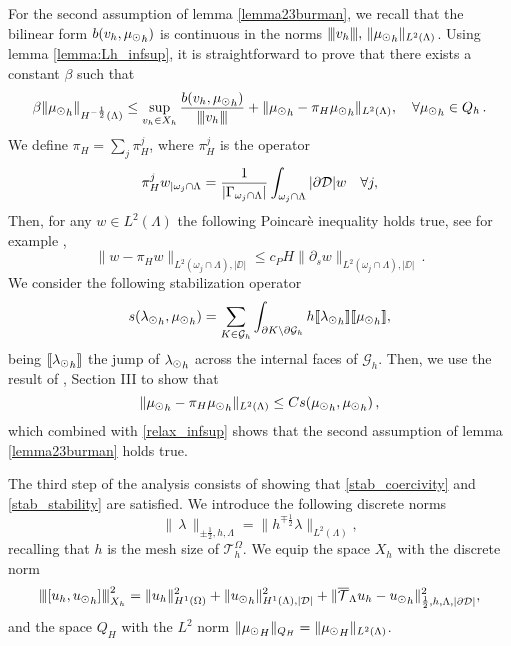 For the second assumption of lemma \ref{lemma23burman}, we recall that the bilinear form $b(v_h,{\mu_{\odot}}_h)$ is continuous in the norms ${\left\vert\kern-0.25ex\left\vert\kern-0.25ex\left\vert v_h \right\vert\kern-0.25ex\right\vert\kern-0.25ex\right\vert},\,\|{\mu_{\odot}}_h\|_{L^2(\Lambda)}$. 
Using lemma \ref{lemma:Lh_infsup}, it is straightforward to prove that there exists a constant $\beta$ such that
\begin{equation}\label{relax_infsup}
\beta \|{\md}_h\|_{H^{-\frac12}(\Lambda)} \leq \sup\limits_{v_h \in X_h} \frac{b(v_h,{\md}_h)}{\vertiii{v_h}} + \|{\md}_h-\pi_H {\md}_h\|_{L^2(\Lambda)}, \quad \forall {\md}_h \in Q_h\,.
\end{equation}
We define $\pi_H = \sum_j \pi_H^j$, where $\pi_H^j$ is the operator
\begin{equation}\label{eq:projector}
\pi_H^j w_{|\patch \cap \Lambda} =\frac{1}{|\Gamma_{\patch\cap \Lambda}|}\int_{\patch\cap \Lambda}|\DD| w\quad \forall j,
\end{equation}   
 Then, for any $w \in L^2(\Lambda)$ the following Poincarè inequality holds true, see for example \cite[Corollary B.65]{MR2050138},
\begin{equation}\label{disc_poincare_ineq}
\|w - \pi_H w\|_{L^2(\omega_j\cap\Lambda),|\DD|} \leq c_P H \|\partial_s w\|_{L^2(\omega_j\cap\Lambda),|\DD|}\,.
\end{equation}
We consider the following stabilization operator
\begin{equation}\label{eq:stab}
s({\ld}_h, {\md}_h)= \sum _{K\in \mathcal{G}_{h}} \int_{\partial K\setminus \partial \mathcal{G}_{h}} h \llbracket {\ld}_h \rrbracket \llbracket {\md}_h \rrbracket,
\end{equation}
being $\llbracket {\lambda_{\odot}}_h \rrbracket$ the jump of ${\lambda_{\odot}}_h$ across the internal faces of $\mathcal{G}_h$.
Then, we use the result of \cite{burman2014}, Section III to show that
\begin{equation*}
    \|{\mu_{\odot}}_h-\pi_H {\mu_{\odot}}_h\|_{L^2(\Lambda)} \leq C s({\mu_{\odot}}_h, {\mu_{\odot}}_h)\,,
\end{equation*}
which combined with \eqref{relax_infsup} shows that the second assumption of lemma \ref{lemma23burman} holds true.

The third step of the analysis consists of showing that \eqref{stab_coercivity} and \eqref{stab_stability} are satisfied. 
We introduce the following discrete norms
\begin{equation*}
\|\, \lambda \,\|_{\pm \frac 12, h, \Lambda} = \|h^{\mp\frac 12} \lambda\|_{L^2(\Lambda)},
\end{equation*}
recalling that $h$ is the mesh size of $\mathcal{T}^\Omega_{h}$. We equip the space $X_h$ with the discrete norm
\begin{equation*}
{\left\vert\kern-0.25ex\left\vert\kern-0.25ex\left\vert [u_h, {u_{\odot}}_h] \right\vert\kern-0.25ex\right\vert\kern-0.25ex\right\vert}^2_{X_h}
= \|u_h\|^2_{H^1(\Omega)}+\|{u_{\odot}}_h\|^2_{H^1(\Lambda),|\mathcal{D}|} + \|{\overline{\mathcal{T}}_\Lambda} u_h - {u_{\odot}}_h\|^2_{\frac 12, h, \Lambda, |\partial\mathcal{D}|},
\end{equation*}
and the space $Q_H$ with the $L^2$ norm 
$\|{\mu_{\odot}}_H \|_{Q_H} = \|{\mu_{\odot}}_H \|_{L^2(\Lambda)}$.

